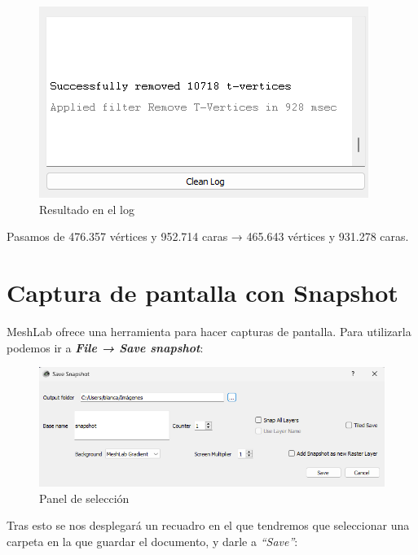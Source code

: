 \documentclass{article}
\begin{document}
\begin{figure}[H]
    \centering
    \includegraphics[scale=0.65]{images/filtro_02.png}
    \caption{Resultado en el log}
\end{figure}

Pasamos de 476.357 vértices y 952.714 caras → 465.643 vértices y 931.278 caras.

\pagebreak

\section{Captura de pantalla con Snapshot}

MeshLab ofrece una herramienta para hacer capturas de pantalla. Para utilizarla podemos ir a \textbf{\textit{File → Save snapshot}}:

\begin{figure}[H]
    \centering
    \includegraphics[scale=0.65]{images/snap_01.png}
    \caption{Panel de selección}
\end{figure}

Tras esto se nos desplegará un recuadro en el que tendremos que seleccionar una carpeta en la que guardar el documento, y darle a \textit{``Save''}:
\end{document}
